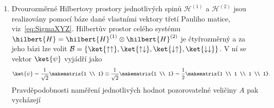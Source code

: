 \begin{solution}
\begin{enumerate}
	\item
		Dvourozměrné Hilbertovy prostory jednotlivých spinů $\mathcal{H}^{(1)}$ a $\mathcal{H}^{(2)}$ jsou realizovány pomocí báze dané vlastními vektory třetí Pauliho matice, viz~\eqref{eq:SigmaXYZ}.
		Hilbertův prostor celého systému $\hilbert{H}=\hilbert{H}^{(1)}\otimes\hilbert{H}^{(2)}$ je čtyřrozměrný a za jeho bázi lze volit $\mathcal{B}=\left\{\ket{\uparrow\uparrow},\ket{\uparrow\downarrow},\ket{\downarrow\uparrow},\ket{\downarrow\downarrow}\right\}$.
		V ní se vektor $\ket{\psi}$ vyjádří jako
		\begin{equation}
			\ket{\psi}
				=\frac{1}{\sqrt{2}}\makematrix{1 \\ 1}\otimes\frac{1}{\sqrt{2}}\makematrix{1 \\ 1}
				=\frac{1}{2}\makematrix{1 \\ 1 \\ 1 \\ 1}.
		\end{equation}		
        Pravděpodobnosti naměření jednotlivých hodnot pozorovatelné veličiny $A$ pak vycházejí

\end{enumerate}
\end{solution}
